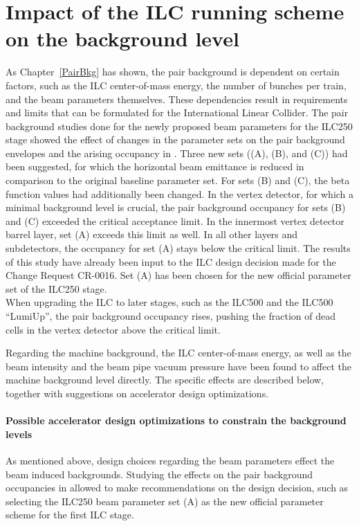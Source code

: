 \section{Impact of the ILC running scheme on the background level}

As Chapter~\ref{PairBkg} has shown, the pair background is dependent on certain factors, such as the ILC center-of-mass energy, the number of bunches per train, and the beam parameters themselves.
These dependencies result in requirements and limits that can be formulated for the International Linear Collider.
The pair background studies done for the newly proposed beam parameters for the ILC250 stage showed the effect of changes in the parameter sets on the pair background envelopes and the arising occupancy in \sid.
Three new sets ((A), (B), and (C)) had been suggested, for which the horizontal beam emittance is reduced in comparison to the original baseline parameter set.
For sets (B) and (C), the beta function values had additionally been changed.
In the \sid vertex detector, for which a minimal background level is crucial, the pair background occupancy for sets (B) and (C) exceeded the critical acceptance limit.
In the innermost vertex detector barrel layer, set (A) exceeds this limit as well.
In all other layers and \sid subdetectors, the occupancy for set (A) stays below the critical limit.
The results of this study have already been input to the ILC design decision made for the Change Request CR-0016.
Set (A) has been chosen for the new official parameter set of the ILC250 stage.
\\When upgrading the ILC to later stages, such as the ILC500 and the ILC500 ``LumiUp'', the pair background occupancy rises, pushing the fraction of dead cells in the \sid vertex detector above the critical limit.

Regarding the machine background, the ILC center-of-mass energy, as well as the beam intensity and the beam pipe vacuum pressure have been found to affect the machine background level directly.
The specific effects are described below, together with suggestions on accelerator design optimizations.

\paragraph{Possible accelerator design optimizations to constrain the background levels}

As mentioned above, design choices regarding the beam parameters effect the beam induced backgrounds.
Studying the effects on the pair background occupancies in \sid allowed to make recommendations on the design decision, such as selecting the ILC250 beam parameter set (A) as the new official parameter scheme for the first ILC stage.

